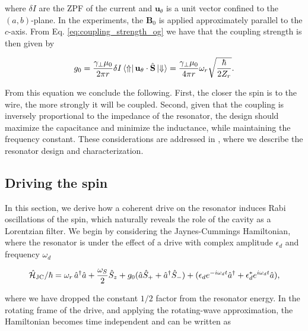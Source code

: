 \noindent where $\delta I$ are the ZPF of the current and $\mathbf{u}_\theta$ is a unit vector confined to the $(a, b)$-plane. In the experiments, the $\mathbf{B}_0$ is applied approximately parallel to the $c$-axis. From Eq. \ref{eq:coupling_strength_og} we have that the coupling strength is then given by

\begin{align}
\begin{split}
    g_0 = \frac{\gamma_\perp \mu_0}{2 \pi r} \delta I \bra{\Uparrow}  \mathbf{u}_\theta \cdot \hat{\mathbf{S}} \ket{\Downarrow} = \frac{\gamma_\perp \mu_0}{4 \pi r} \omega_r \sqrt{\frac{\hbar}{2Z_r}}.
\end{split}
\label{eq:coupling_strength_nanowire}
\end{align}

From this equation we conclude the following. First, the closer the spin is to the wire, the more strongly it will be coupled. Second, given that the coupling is inversely proportional to the impedance of the resonator, the design should maximize the capacitance and minimize the inductance, while maintaining the frequency constant. These considerations are addressed in , where we describe the resonator design and characterization.

\subsection{Driving the \Er spin}

In this section, we derive how a coherent drive on the resonator induces Rabi oscillations of the spin, which naturally reveals the role of the cavity as a Lorentzian filter. We begin by considering the Jaynes-Cummings Hamiltonian, where the resonator is under the effect of a drive with complex amplitude $\epsilon_d$ and frequency $\omega_d$

\begin{equation}
    \hat{\mathcal{H}}_{\text{JC}} / \hbar = \omega_r\,\hat{a}^\dagger \hat{a} +  \frac{\omega_S}{2} \hat{S}_z + g_{0} ( \hat{a}\hat{S}_{+} + \hat{a}^{\dagger}\hat{S}_{-} ) + (\epsilon_d e^{-i\omega_d t} \hat{a}^\dagger + \epsilon_d^* e^{i\omega_d t} \hat{a}),
\end{equation}

where we have dropped the constant $1/2$ factor from the resonator energy. In the rotating frame of the drive, and applying the rotating-wave approximation, the Hamiltonian becomes time independent and can be written as

